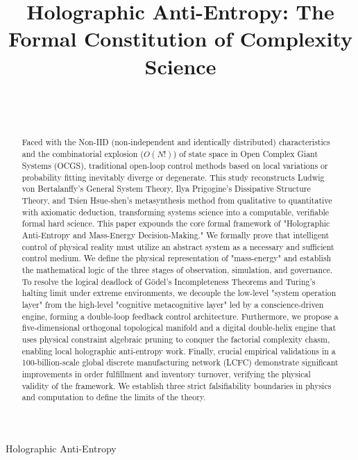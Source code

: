 \documentclass{article}
\begin{document}
\title{Holographic Anti-Entropy: The Formal Constitution of Complexity Science}

\author{\\[2pt]
\\
}

{Holographic Anti-Entropy}

\maketitle

\begin{abstract}
Faced with the Non-IID (non-independent and identically distributed) characteristics and the combinatorial explosion ($O(N!)$) of state space in Open Complex Giant Systems (OCGS), traditional open-loop control methods based on local variations or probability fitting inevitably diverge or degenerate. This study reconstructs Ludwig von Bertalanffy's General System Theory, Ilya Prigogine's Dissipative Structure Theory, and Tsien Hsue-shen's metasynthesis method from qualitative to quantitative with axiomatic deduction, transforming systems science into a computable, verifiable formal hard science. This paper expounds the core formal framework of "Holographic Anti-Entropy and Mass-Energy Decision-Making." We formally prove that intelligent control of physical reality must utilize an abstract system as a necessary and sufficient control medium. We define the physical representation of "mass-energy" and establish the mathematical logic of the three stages of observation, simulation, and governance. To resolve the logical deadlock of G\"odel's Incompleteness Theorems and Turing's halting limit under extreme environments, we decouple the low-level "system operation layer" from the high-level "cognitive metacognitive layer" led by a conscience-driven engine, forming a double-loop feedback control architecture. Furthermore, we propose a five-dimensional orthogonal topological manifold and a digital double-helix engine that uses physical constraint algebraic pruning to conquer the factorial complexity chasm, enabling local holographic anti-entropy work. Finally, crucial empirical validations in a 100-billion-scale global discrete manufacturing network (LCFC) demonstrate significant improvements in order fulfillment and inventory turnover, verifying the physical validity of the framework. We establish three strict falsifiability boundaries in physics and computation to define the limits of the theory.
\end{abstract}
\end{document}
